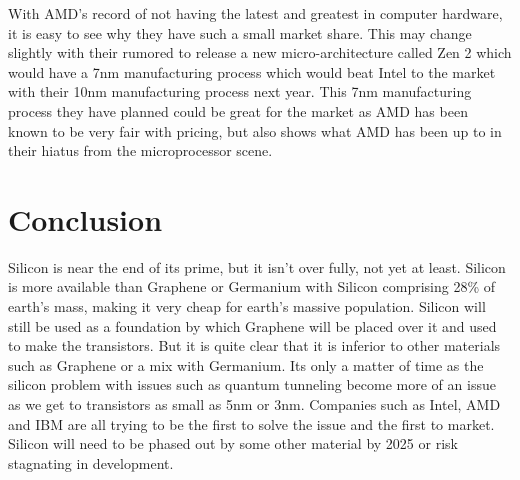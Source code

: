 \documentclass[journal]{IEEEtran}
\begin{document}
With AMD's record of not having the latest and greatest in computer hardware, it is easy to see why they have such a small market share. This may change slightly with their rumored to release a new micro-architecture called Zen 2 which would have a 7nm manufacturing process which would beat Intel to the market with their 10nm manufacturing process next year. This 7nm manufacturing process they have planned could be great for the market as AMD has been known to be very fair with pricing, but also shows what AMD has been up to in their hiatus from the microprocessor scene.

\section{Conclusion}
Silicon is near the end of its prime, but it isn't over fully, not yet at least. Silicon is more available than Graphene or Germanium with Silicon comprising 28\% of earth's mass, making it very cheap for earth's massive population. Silicon will still be used as a foundation by which Graphene will be placed over it and used to make the transistors. But it is quite clear that it is inferior to other materials such as Graphene or a mix with Germanium. Its only a matter of time as the silicon problem with issues such as quantum tunneling become more of an issue as we get to transistors as small as 5nm or 3nm. Companies such as Intel, AMD and IBM are all trying to be the first to solve the issue and the first to market. Silicon will need to be phased out by some other material by 2025 or risk stagnating in development.

\printbibliography
\end{document}
